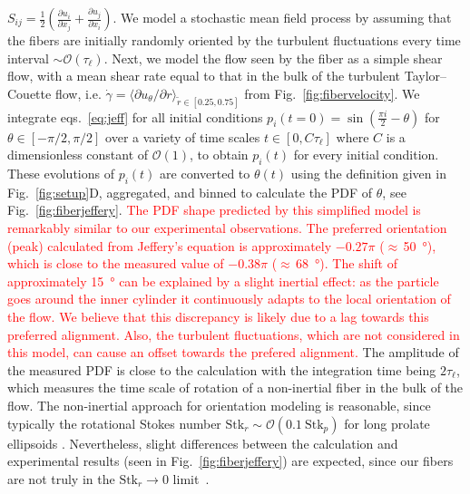 \documentclass[aps, pre, onecolumn, superscriptaddress,longbibliography]{revtex4-1}
\newcommand{\makered}[1]{\textcolor{red}{#1}}
\begin{document}
$S_{ij}= \frac 12 \left(\frac{\partial u_i}{\partial x_j} + \frac{\partial u_j}{\partial x_i} \right)$.
We model a stochastic mean field process by assuming that the fibers
are initially randomly oriented by the turbulent fluctuations every time
interval $\sim \mathcal{O}(\tau_\ell)$. Next, we model the flow seen by the
fiber as a simple shear flow, with a mean shear rate equal to that in the bulk
of the turbulent Taylor--Couette flow, i.e.
$\dot \gamma = \langle \partial u_\theta / \partial r \rangle_{\tilde{r}\in[0.25,0.75]}$ from
Fig.~\ref{fig:fibervelocity}. We integrate eqs.~\ref{eq:jeff} for all initial
conditions $p_i(t=0) = \sin \left(\frac{\pi  i}{2}-\theta \right)$ for 
$\theta \in [-\pi/2,\pi/2]$ over a variety of time scales $t \in [0,C\tau_\ell]$ where
$C$ is a dimensionless constant of $\mathcal{O}(1)$, to obtain $p_i(t)$ for
every initial condition. These evolutions of $p_i(t)$ are converted to
$\theta(t)$ using the definition given in Fig.~\ref{fig:setup}D, aggregated,
and binned to calculate the PDF of $\theta$, see Fig.~\ref{fig:fiberjeffery}.
\makered{The PDF shape predicted by this simplified model is remarkably similar to our experimental observations.}
\makered{The preferred orientation (peak) calculated from
Jeffery's equation is approximately $-0.27\pi$ ($\approx$\,\SI{50}{\degree}), which is close to the measured value of $-0.38\pi$ ($\approx$\,\SI{68}{\degree}).}
\makered{%
The shift of approximately \SI{15}{\degree} can be explained by a slight inertial effect: as the particle goes around the inner cylinder it continuously adapts to the local orientation of the flow.
We believe that this discrepancy is likely due to a lag towards this preferred alignment.
Also, the turbulent fluctuations, which are not considered in this model, can cause an offset towards the prefered alignment.
}%
The amplitude of the measured PDF is close to the
calculation with the integration time being $2 \tau_\ell$, which measures the
time scale of rotation of a non-inertial fiber in the bulk of the flow. The
non-inertial approach for orientation modeling
is reasonable, since typically the rotational Stokes number 
$\text{Stk}_r \sim \mathcal{O}(0.1 \ \text{Stk}_p)$ for long prolate ellipsoids \cite{Zhao2015}.
Nevertheless, slight differences between the calculation and experimental
results (seen in Fig.~\ref{fig:fiberjeffery}) are expected, since our fibers
are not truly in the $\text{Stk}_r \to 0$ limit~\cite{Challabotla2015b}.\\%
%
\end{document}
